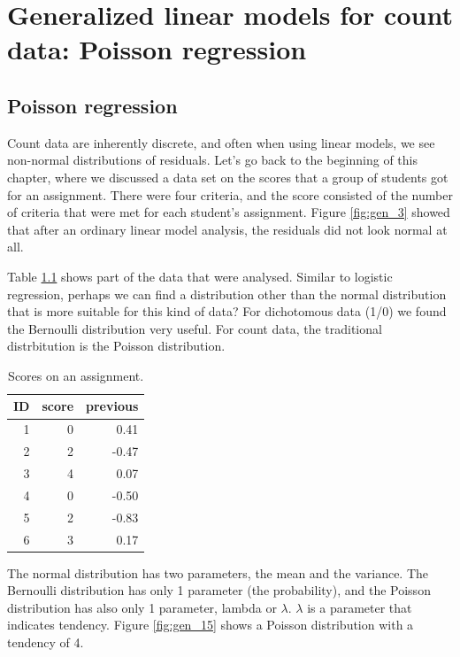 \documentclass[]{report}\usepackage[]{graphicx}\usepackage[]{color}
\begin{document}
% 




\chapter{Generalized linear models for count data: Poisson regression}\label{chap:poisson}


\section{Poisson regression}


Count data are inherently discrete, and often when using linear models, we see non-normal distributions of residuals. Let's go back to the beginning of this chapter, where we discussed a data set on the scores that a group of students got for an assignment. There were four criteria, and the score consisted of the number of criteria that were met for each student's assignment. Figure \ref{fig:gen_3} showed that after an ordinary linear model analysis, the residuals did not look normal at all.

Table \ref{tab:gen_14} shows part of the data that were analysed. Similar to logistic regression, perhaps we can find a distribution other than the normal distribution that is more suitable for this kind of data? For dichotomous data (1/0) we found the Bernoulli distribution very useful. For count data, the traditional distrbitution is the Poisson distribution.


\begin{table}[ht]
\centering
\caption{Scores on an assignment.} 
\label{tab:gen_14}
\begin{tabular}{rrr}
  \hline
ID & score & previous \\ 
  \hline
1 & 0 & 0.41 \\ 
  2 & 2 & -0.47 \\ 
  3 & 4 & 0.07 \\ 
  4 & 0 & -0.50 \\ 
  5 & 2 & -0.83 \\ 
  6 & 3 & 0.17 \\ 
   \hline
\end{tabular}
\end{table}


The normal distribution has two parameters, the mean and the variance. The Bernoulli distribution has only 1 parameter (the probability), and the Poisson distribution has also only 1 parameter, lambda or $\lambda$. $\lambda$ is a parameter that indicates tendency. Figure \ref{fig:gen_15} shows a Poisson distribution with a tendency of 4.
\end{document}
